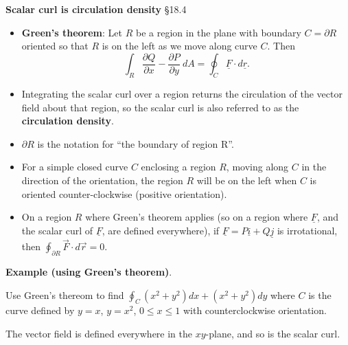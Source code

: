 \documentclass[12pt,letterpaper,noanswers]{exam}
\newcommand{\mb}[1]{\underline{#1}}
\begin{document}
\eject


\noindent\textbf{Scalar curl is circulation density} \S 18.4
\begin{tcolorbox}
\begin{itemize}
    \item \textbf{Green's theorem}: Let $R$ be a region in the plane with boundary $C = \partial R$ oriented so that $R$ is on the left as we move along curve $C$.  Then \[\int_R  \frac{\partial Q}{\partial x} - \frac{\partial P}{\partial y}\ dA = \oint_C \mb F \cdot d\mb r.\]
    \item Integrating the scalar curl over a region returns the circulation of the vector field about that region, so the scalar curl is also referred to as the \textbf{circulation density}.
    \item $\partial R$ is the notation for ``the boundary of region R''.
    \item For a simple closed curve $C$ enclosing a region $R$, moving along $C$ in the direction of the orientation, the region $R$ will be on the left when $C$ is oriented counter-clockwise (positive orientation).
    \item On a region $R$ where Green's theorem applies (so on a region where $\mb F$, and the scalar curl of $\mb F$, are defined everywhere), if $\mb F = P\mb i + Q\mb j$ is irrotational, then $\displaystyle\oint_{\partial R}\vec F\cdot d\vec r = 0$.
\end{itemize}
 

\end{tcolorbox}

\noindent\textbf{Example (using Green's theorem)}.

Use Green's thereom to find $\displaystyle\oint_C (x^2+y^2)dx + (x^2+y^2)dy$ where $C$ is the curve defined by $y = x$, $y = x^2$, $0\leq x\leq 1$ with counterclockwise orientation.

The vector field is defined everywhere in the $xy$-plane, and so is the scalar curl.
\end{document}
